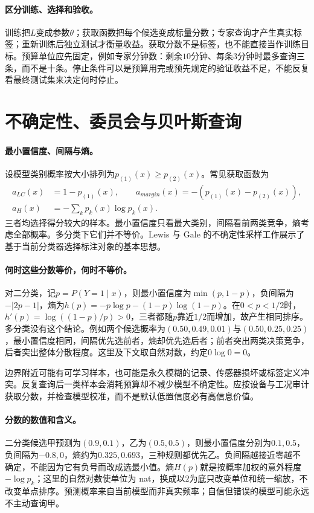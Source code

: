 \paragraph{区分训练、选择和验收。}
训练把$L$变成参数$\theta$；获取函数把每个候选变成标量分数；专家查询才产生真实标签；重新训练后独立测试才衡量收益。获取分数不是标签，也不能直接当作训练目标。预算单位应先固定，例如专家分钟数：剩余$10$分钟、每条$3$分钟时最多查询三条，而不是十条。停止条件可以是预算用完或预先规定的验证收益不足，不能反复看最终测试集来决定何时停止。

\section{不确定性、委员会与贝叶斯查询}
\paragraph{最小置信度、间隔与熵。}
设模型类别概率按大小排列为$p_{(1)}(x)\geq p_{(2)}(x)$。常见获取函数为
\begin{align}
 a_{LC}(x)&=1-p_{(1)}(x),\qquad
 a_{margin}(x)=-(p_{(1)}(x)-p_{(2)}(x)),\\
 a_H(x)&=-\sum_kp_k(x)\log p_k(x).
\end{align}
三者均选择得分较大的样本。最小置信度只看最大类别，间隔看前两类竞争，熵考虑全部概率。多分类下它们并不等价。Lewis 与 Gale 的不确定性采样工作展示了基于当前分类器选择标注对象的基本思想\cite{lewis1994uncertainty}。

\paragraph{何时这些分数等价，何时不等价。}
对二分类，记$p=P(Y=1\mid x)$，则最小置信度为$\min(p,1-p)$，负间隔为$-|2p-1|$，熵为$h(p)=-p\log p-(1-p)\log(1-p)$。在$0<p<1/2$时，$h'(p)=\log((1-p)/p)>0$，三者都随$p$靠近$1/2$而增加，故产生相同排序。多分类没有这个结论。例如两个候选概率为$(0.50,0.49,0.01)$与$(0.50,0.25,0.25)$，最小置信度相同，间隔优先选前者，熵却优先选后者；前者突出两类决策竞争，后者突出整体分散程度。这里及下文取自然对数，约定$0\log0=0$。

边界附近可能有可学习样本，也可能是永久模糊的记录、传感器损坏或标签定义冲突。反复查询后一类样本会消耗预算却不减少模型不确定性。应按设备与工况审计获取分数，并检查模型校准，而不是默认低置信度必有高信息价值。

\paragraph{分数的数值和含义。}
二分类候选甲预测为$(0.9,0.1)$，乙为$(0.5,0.5)$，则最小置信度分别为$0.1,0.5$，负间隔为$-0.8,0$，熵约为$0.325,0.693$，三种规则都优先乙。负间隔越接近零越不确定，不能因为它有负号而改成选最小值。熵$H(p)$就是按概率加权的意外程度$-\log p_k$；这里的自然对数使单位为 nat，换成以$2$为底只改变单位和统一缩放，不改变单点排序。预测概率来自当前模型而非真实频率；自信但错误的模型可能永远不主动查询甲。

